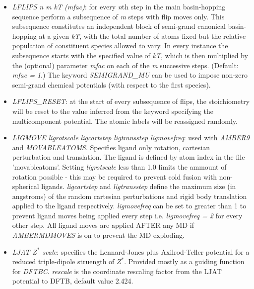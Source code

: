 \documentclass[12pt,a4paper,dvips]{article}
\begin{document}
\begin{itemize}
\item {\it LFLIPS n m kT (mfac)\/}: for every {\it n}th step in the main basin-hopping sequence perform a subsequence of {\it m} steps with flip moves only. This subsequence constitutes an independent block of semi-grand canonical basin-hopping at a given {\it kT}, with the total number of atoms fixed but the relative population of constituent species allowed to vary. In every instance the subsequence starts with the specified value of {\it kT}, which is then multiplied by the (optional) parameter {\it mfac} on each of the {\it m} successive steps. (Default: {\it mfac = 1}.) The keyword {\it SEMIGRAND\_MU} can be used to impose non-zero semi-grand chemical potentials (with respect to the first species). 

\item {\it LFLIPS\_RESET\/}: at the start of every subsequence of flips, the stoichiometry will be reset to the value inferred from the keyword specifying the multicomponent potential. The atomic labels will be reassigned randomly.

\item {\it LIGMOVE ligrotscale ligcartstep ligtransstep ligmovefreq\/}: used with {\it AMBER9\/} and {\it MOVABLEATOMS}. Specifies ligand only rotation, cartesian perturbation and translation. The ligand is defined by atom index in the file 'movableatoms'. Setting {\it ligrotscale} less than 1.0
limits the ammount of rotation possible - this may be required to prevent cold fusion with non-spherical ligands. {\it ligcartstep} and {\it ligtransstep} 
define the maximum size (in angstroms) of the random cartesian perturbations and rigid body translation applied to the ligand respectively. 
{\it ligmovefreq} can be set to greater than 1 to prevent ligand moves being applied every step i.e. {\it ligmovefreq = 2} for every other step.
All ligand moves are applied AFTER any MD if {\it AMBERMDMOVES} is on to prevent the MD exploding.    

\item {\it LJAT $Z^*$ scale\/}: specifies the Lennard-Jones plus Axilrod-Teller 
potential for a reduced triple-dipole struength of $Z^*$.
Provided mostly as a guiding function for {\it DFTBC\/}. 
{\it rescale\/} is the coordinate rescaling factor from the LJAT potential
to DFTB, default value 2.424.


\end{itemize}
\end{document}
